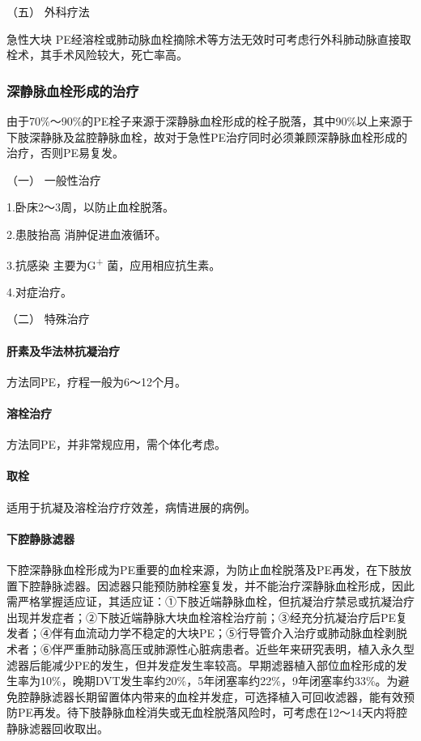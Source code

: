 \hypertarget{text00278.htmlux5cux23CHP9-8-3-1-5}{}
（五） 外科疗法

急性大块
PE经溶栓或肺动脉血栓摘除术等方法无效时可考虑行外科肺动脉直接取栓术，其手术风险较大，死亡率高。

\subsubsection{深静脉血栓形成的治疗}

由于70\%～90\%的PE栓子来源于深静脉血栓形成的栓子脱落，其中90\%以上来源于下肢深静脉及盆腔静脉血栓，故对于急性PE治疗同时必须兼顾深静脉血栓形成的治疗，否则PE易复发。

\hypertarget{text00278.htmlux5cux23CHP9-8-3-2-1}{}
（一） 一般性治疗

1.卧床2～3周，以防止血栓脱落。

2.患肢抬高 消肿促进血液循环。

3.抗感染 主要为G\textsuperscript{+} 菌，应用相应抗生素。

4.对症治疗。

\hypertarget{text00278.htmlux5cux23CHP9-8-3-2-2}{}
（二） 特殊治疗

\paragraph{肝素及华法林抗凝治疗}

方法同PE，疗程一般为6～12个月。

\paragraph{溶栓治疗}

方法同PE，并非常规应用，需个体化考虑。

\paragraph{取栓}

适用于抗凝及溶栓治疗疗效差，病情进展的病例。

\paragraph{下腔静脉滤器}

下腔深静脉血栓形成为PE重要的血栓来源，为防止血栓脱落及PE再发，在下肢放置下腔静脉滤器。因滤器只能预防肺栓塞复发，并不能治疗深静脉血栓形成，因此需严格掌握适应证，其适应证：①下肢近端静脉血栓，但抗凝治疗禁忌或抗凝治疗出现并发症者；②下肢近端静脉大块血栓溶栓治疗前；③经充分抗凝治疗后PE复发者；④伴有血流动力学不稳定的大块PE；⑤行导管介入治疗或肺动脉血栓剥脱术者；⑥伴严重肺动脉高压或肺源性心脏病患者。近些年来研究表明，植入永久型滤器后能减少PE的发生，但并发症发生率较高。早期滤器植入部位血栓形成的发生率为10\%，晚期DVT发生率约20\%，5年闭塞率约22\%，9年闭塞率约33\%。为避免腔静脉滤器长期留置体内带来的血栓并发症，可选择植入可回收滤器，能有效预防PE再发。待下肢静脉血栓消失或无血栓脱落风险时，可考虑在12～14天内将腔静脉滤器回收取出。

